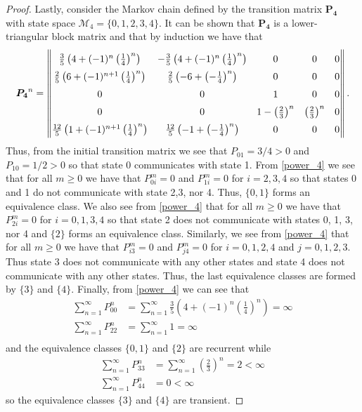 \begin{proof}
  Lastly, consider the Markov chain defined by the transition matrix $\boldsymbol{P_4}$ with state space $\mathcal{M}_4 = \{0, 1, 2, 3, 4\}$.
  It can be shown that $\boldsymbol{P_4}$ is a lower-triangular block matrix and that by induction we have that
  \begin{align}\label{power_4}
    \renewcommand\arraystretch{1.5}
    \boldsymbol{P_4}^n =
    \begin{Vmatrix}
      \frac{3}{5} \left(4 + (-1)^n\left(\frac{1}{4}\right)^n\right)     & -\frac{3}{5} \left(4 + (-1)^n\left(\frac{1}{4}\right)^n\right) & 0           & 0           & 0           \\
      \frac{2}{5} \left(6 + (-1)^{n+1} \left(\frac{1}{4}\right)^n\right) & \frac{2}{5} \left(-6 + \left(-\frac{1}{4}\right)^n\right) & 0           & 0           & 0           \\
      0           & 0           & 1           & 0           & 0           \\
      0           & 0           & 1 - \left(\frac{2}{3}\right)^n & \left(\frac{2}{3}\right)^n & 0           \\
      \frac{12}{5} \left(1 + (-1)^{n+1} \left(\frac{1}{4}\right)^n\right)           & \frac{12}{5} \left(-1 + \left(-\frac{1}{4}\right)^n\right)             & 0           & 0           & 0           \\
    \end{Vmatrix}.
  \end{align}
  Thus, from the initial transition matrix we see that $P_{01} = 3/4 > 0$ and $P_{10} = 1/2 > 0$
  so that state 0 communicates with state 1. From \eqref{power_4} we see that for all $m \geq 0$ we have that
  $P_{0i}^m = 0$ and $P_{1i}^m = 0$ for $i=2,3,4$ so that states 0 and 1 do not communicate with state 2,3, nor 4.
  Thus, $\{0, 1\}$ forms an equivalence class.
  We also see from \eqref{power_4} that for all $m\geq 0$ we have that $P_{2i}^m = 0$ for $i = 0, 1, 3, 4$
  so that state 2 does not communicate with states 0, 1, 3, nor 4 and $\{2\}$ forms an equivalence class.
  Similarly, we see from \eqref{power_4} that for all $m\geq 0$ we have that $P_{i3}^m = 0$ and $P_{j4}^m = 0$
  for $i=0,1,2,4$ and $j=0,1,2,3$. Thus state 3 does not communicate with any other states and state 4 does not communicate
  with any other states. Thus, the last equivalence classes are formed by $\{3\}$ and $\{4\}$.
  Finally, from \eqref{power_4} we can see that
  \begin{align*}
    \sum_{n=1}^\infty P_{00}^n &= \sum_{n=1}^\infty \frac{3}{5} \left(4 + (-1)^n\left(\frac{1}{4}\right)^n\right) =\infty \\
    \sum_{n=1}^\infty P_{22}^n &= \sum_{n=1}^\infty 1 =\infty \\
  \end{align*}
  and the equivalence classes $\{0,1\}$ and $\{2\}$ are recurrent while
  \begin{align*}
    \sum_{n=1}^\infty P_{33}^n &= \sum_{n=1}^\infty \left(\frac{2}{3}\right)^n = 2 < \infty \\
    \sum_{n=1}^\infty P_{44}^n &= 0 < \infty
  \end{align*}
  so the equivalence classes $\{3\}$ and $\{4\}$ are transient.

\end{proof}
\newpage
